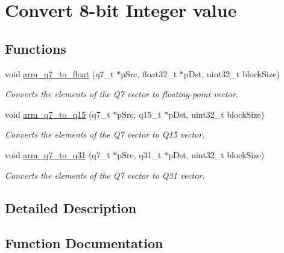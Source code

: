 \hypertarget{group__q7__to__x}{}\section{Convert 8-\/bit Integer value}
\label{group__q7__to__x}
\subsection*{Functions}
\begin{DoxyCompactItemize}
\item 
void \hyperlink{group__q7__to__x_ga656620f957b65512ed83db03fd455ec5}{arm\+\_\+q7\+\_\+to\+\_\+float} (q7\+\_\+t $\ast$p\+Src, float32\+\_\+t $\ast$p\+Dst, uint32\+\_\+t block\+Size)
\begin{DoxyCompactList}\small\item\em Converts the elements of the Q7 vector to floating-\/point vector. \end{DoxyCompactList}\item 
void \hyperlink{group__q7__to__x_gabc02597fc3f01033daf43ec0547a2f78}{arm\+\_\+q7\+\_\+to\+\_\+q15} (q7\+\_\+t $\ast$p\+Src, q15\+\_\+t $\ast$p\+Dst, uint32\+\_\+t block\+Size)
\begin{DoxyCompactList}\small\item\em Converts the elements of the Q7 vector to Q15 vector. \end{DoxyCompactList}\item 
void \hyperlink{group__q7__to__x_gad8958cd3cb7f521466168b46a25b7908}{arm\+\_\+q7\+\_\+to\+\_\+q31} (q7\+\_\+t $\ast$p\+Src, q31\+\_\+t $\ast$p\+Dst, uint32\+\_\+t block\+Size)
\begin{DoxyCompactList}\small\item\em Converts the elements of the Q7 vector to Q31 vector. \end{DoxyCompactList}\end{DoxyCompactItemize}


\subsection{Detailed Description}


\subsection{Function Documentation}
